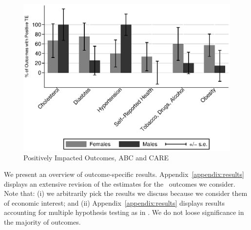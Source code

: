 \begin{figure}[H]
		\caption{Positively Impacted Outcomes, ABC and CARE} \label{fig:ppositivecategory2}
		\includegraphics[width=.9\columnwidth]{output/itt_noctrl_cats2.eps}
\end{figure}

\noindent We present an overview of outcome-specific results. Appendix~\ref{appendix:results} displays an extensive revision of the estimates for the \noutcomes\ outcomes we consider. Note that: (i) we arbitrarily pick the results we discuss because we consider them of economic interest; and (ii) Appendix~\ref{appendix:results} displays results accounting for multiple hypothesis testing as in \citet{Lehman_Romano_2005_AnnStat,Romano_Shaikh_2006_AnnStat}. We do not loose significance in the majority of outcomes.\\

